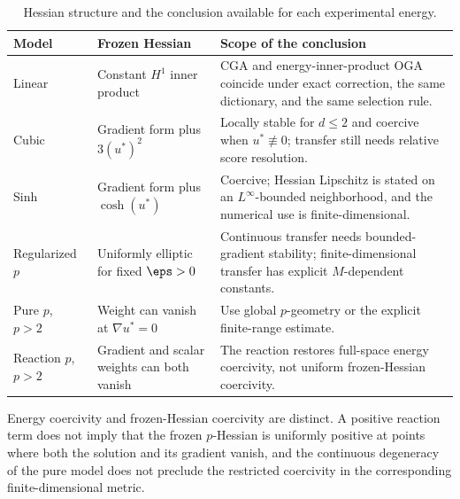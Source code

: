 \begin{table}[tbp]
\centering
\small
\caption{Hessian structure and the conclusion available for each experimental energy.}
\label{tab:model-classification}
\begin{tabularx}{\textwidth}{@{}>{\raggedright\arraybackslash}p{}>{\raggedright\arraybackslash}p{}>{\raggedright\arraybackslash}X@{}}
\toprule
Model & Frozen Hessian & Scope of the conclusion \\
\midrule
Linear & Constant \(H^1\) inner product & CGA and energy-inner-product OGA coincide under exact correction, the same dictionary, and the same selection rule. \\
Cubic & Gradient form plus \(3(u^*)^2\) & Locally stable for \(d\leq2\) and coercive when \(u^*\not\equiv0\); transfer still needs relative score resolution. \\
Sinh & Gradient form plus \(\cosh(u^*)\) & Coercive; Hessian Lipschitz is stated on an \(L^\infty\)-bounded neighborhood, and the numerical use is finite-dimensional. \\
Regularized \(p\) & Uniformly elliptic for fixed \(\eps>0\) & Continuous transfer needs bounded-gradient stability; finite-dimensional transfer has explicit \(M\)-dependent constants. \\
Pure \(p\), \(p>2\) & Weight can vanish at \(\nabla u^*=0\) & Use global \(p\)-geometry or the explicit finite-range estimate. \\
Reaction \(p\), \(p>2\) & Gradient and scalar weights can both vanish & The reaction restores full-space energy coercivity, not uniform frozen-Hessian coercivity. \\
\bottomrule
\end{tabularx}
\end{table}

Energy coercivity and frozen-Hessian coercivity are distinct. A positive reaction term does
not imply that the frozen \(p\)-Hessian is uniformly positive at points where both the solution and its
gradient vanish, and the continuous degeneracy of the pure model does not preclude the restricted
coercivity in the corresponding finite-dimensional metric.
